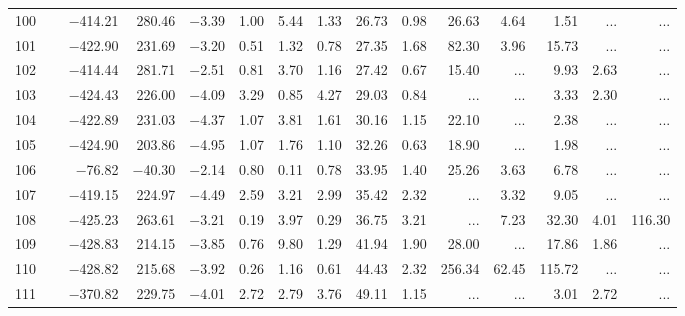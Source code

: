 \begin{table*}[p]
{\begin{tabular}{l@{ }r@{ \ }rr@{ \ }rr@{ \ }rrrr@{ \ }r@{ \ }r@{ \ }r@{ \ }r}
100   \ \dotfill \  &  $-$414.21 &    280.46 &  $-$3.39 &   1.00 &    5.44 &   1.33&   26.73 &   0.98&       26.63 &        4.64 &        1.51 &    ...     &    ...       \\     
101   \ \dotfill \  &  $-$422.90 &    231.69 &  $-$3.20 &   0.51 &    1.32 &   0.78&   27.35 &   1.68 &       82.30 &        3.96 &       15.73 &    ...     &    ...       \\     
102   \ \dotfill \  &  $-$414.44 &    281.71 &  $-$2.51 &   0.81 &    3.70 &   1.16&   27.42 &   0.67&       15.40 &    ...     &        9.93 &        2.63 &    ...       \\     
103   \ \dotfill \  &  $-$424.43 &    226.00 &  $-$4.09 &   3.29 &    0.85 &   4.27&   29.03 &   0.84 &    ...     &    ...     &        3.33 &        2.30 &    ...       \\     
104   \ \dotfill \  &  $-$422.89 &    231.03 &  $-$4.37 &   1.07 &    3.81 &   1.61&   30.16 &   1.15&       22.10 &    ...     &        2.38 &    ...     &    ...       \\     
105   \ \dotfill \  &  $-$424.90 &    203.86 &  $-$4.95 &   1.07 &    1.76 &   1.10&   32.26 &   0.63&       18.90 &    ...     &        1.98 &    ...     &    ...       \\     
106   \ \dotfill \  &   $-$76.82 &   $-$40.30 &  $-$2.14 &   0.80 &    0.11 &   0.78&   33.95 &   1.40 &       25.26 &        3.63 &        6.78 &    ...     &    ...       \\     
107   \ \dotfill \  &  $-$419.15 &    224.97 &  $-$4.49 &   2.59 &    3.21 &   2.99&   35.42 &   2.32 &    ...     &        3.32 &        9.05 &    ...     &    ...       \\     
108   \ \dotfill \  &  $-$425.23 &    263.61 &  $-$3.21 &   0.19 &    3.97 &   0.29&   36.75 &   3.21 &    ...     &        7.23 &       32.30 &        4.01 &      116.30   \\     
109   \ \dotfill \  &  $-$428.83 &    214.15 &  $-$3.85 &   0.76 &    9.80 &   1.29&   41.94 &   1.90&       28.00 &    ...     &       17.86 &        1.86 &    ...       \\     
110   \ \dotfill \  &  $-$428.82 &    215.68 &  $-$3.92 &   0.26 &    1.16 &   0.61&   44.43 &   2.32&      256.34 &       62.45 &      115.72 &    ...     &    ...       \\     
111   \ \dotfill \  &  $-$370.82 &    229.75 &  $-$4.01 &   2.72 &    2.79 &   3.76&   49.11 &   1.15&    ...     &    ...     &        3.01 &        2.72 &    ...       \\     

\end{tabular}}
\end{table*}

